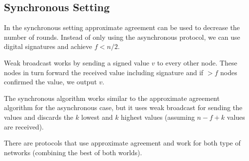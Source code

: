  
\subsection{Synchronous Setting}
 
In the synchronous setting approximate agreement can be used to decrease the number of rounds. Instead of only using the asynchronous protocol, we can use digital signatures and achieve $f < n/2$. \medskip
 
Weak broadcast works by sending a signed value $v$ to every other node. These nodes in turn forward the received value including signature and if $>f$ nodes confirmed the value, we output $v$. \medskip

The synchronous algorithm works similar to the approximate agreement algorithm for the asynchronous case, but it uses weak broadcast for sending the values and discards the $k$ lowest and $k$ highest values (assuming $n-f+k$ values are received). \medskip

There are protocols that use approximate agreement and work for both type of networks (combining the best of both worlds).